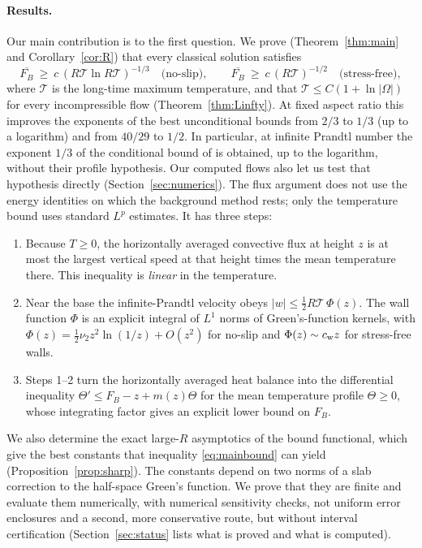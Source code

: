 \paragraph{Results.} Our main contribution is to the first question. We prove
(Theorem~\ref{thm:main} and Corollary~\ref{cor:R}) that every classical solution satisfies
\[
\overline{F_B}\ \ge\ c\,(R\mathcal T\ln R\mathcal T)^{-1/3}\quad\text{(no-slip)},\qquad
\overline{F_B}\ \ge\ c\,(R\mathcal T)^{-1/2}\quad\text{(stress-free)},
\]
where $\mathcal T$ is the long-time maximum temperature, and that $\mathcal T\le C(1+\ln|\Omega|)$ for every
incompressible flow (Theorem~\ref{thm:Linfty}). At fixed aspect ratio this improves the exponents of the best unconditional bounds from
$2/3$ to $1/3$ (up to a logarithm) and from $40/29$ to $1/2$. In particular, at infinite Prandtl number the
exponent $1/3$ of the conditional bound of \citet{ChenEtAl2024} is obtained, up to the logarithm, without their
profile hypothesis. Our computed flows also let us test that hypothesis directly (Section~\ref{sec:numerics}). The
flux argument does not use the energy identities on which the background method rests; only the temperature bound
uses standard $L^p$ estimates. It has three steps:
\begin{enumerate}
\item Because $T\ge0$, the horizontally averaged convective flux at height $z$ is at most the largest vertical
speed at that height times the mean temperature there. This inequality is \emph{linear} in the temperature.
\item Near the base the infinite-Prandtl velocity obeys $|w|\le\tfrac12R\mathcal T\,\Phi(z)$. The wall
function $\Phi$ is an explicit integral of $L^1$ norms of Green's-function kernels, with
$\Phi(z)=\tfrac12\nu_2z^2\ln(1/z)+O(z^2)$ for no-slip and $\Phi(z)\sim c_{\rm w}z$ for stress-free walls.
\item Steps 1--2 turn the horizontally averaged heat balance into the differential inequality
$\Theta'\le F_B-z+m(z)\Theta$ for the mean temperature profile $\Theta\ge0$, whose integrating factor gives an
explicit lower bound on $F_B$.
\end{enumerate}
We also determine the exact large-$R$ asymptotics of the bound functional, which give the best constants that
inequality \eqref{eq:mainbound} can yield (Proposition~\ref{prop:sharp}). The constants depend on two norms of a
slab correction to the half-space Green's function. We prove that they are finite and evaluate them numerically,
with numerical sensitivity checks, not uniform error enclosures and a second, more conservative route, but without interval certification
(Section~\ref{sec:status} lists what is proved and what is computed).

